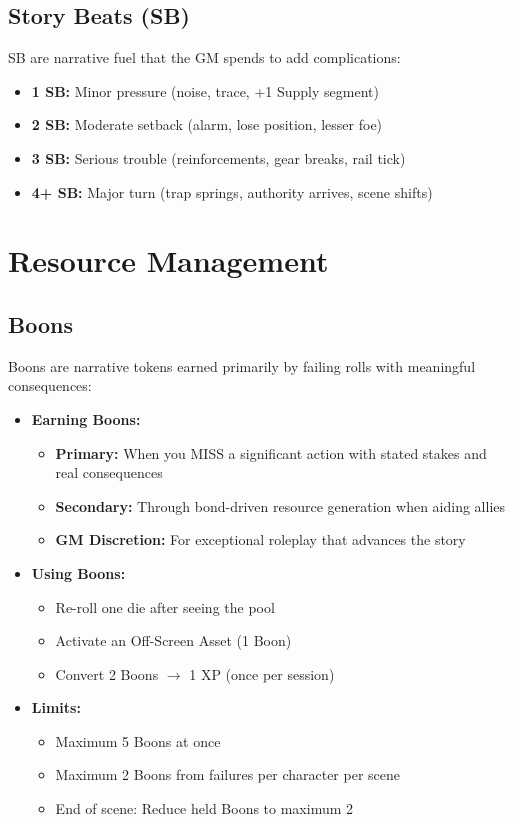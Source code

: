 \documentclass[11pt]{article}
\begin{document}
\subsection{Story Beats (SB)}

SB are narrative fuel that the GM spends to add complications:
\begin{itemize}
\item \textbf{1 SB:} Minor pressure (noise, trace, +1 Supply segment)
\item \textbf{2 SB:} Moderate setback (alarm, lose position, lesser foe)
\item \textbf{3 SB:} Serious trouble (reinforcements, gear breaks, rail tick)
\item \textbf{4+ SB:} Major turn (trap springs, authority arrives, scene shifts)
\end{itemize}

\section{Resource Management}

\subsection{Boons}

Boons are narrative tokens earned primarily by failing rolls with meaningful consequences:

\begin{itemize}
\item \textbf{Earning Boons:}
   \begin{itemize}
   \item \textbf{Primary:} When you MISS a significant action with stated stakes and real consequences
   \item \textbf{Secondary:} Through bond-driven resource generation when aiding allies
   \item \textbf{GM Discretion:} For exceptional roleplay that advances the story
   \end{itemize}
\item \textbf{Using Boons:}
   \begin{itemize}
   \item Re-roll one die after seeing the pool
   \item Activate an Off-Screen Asset (1 Boon)
   \item Convert 2 Boons $\rightarrow$ 1 XP (once per session)
   \end{itemize}
\item \textbf{Limits:}
   \begin{itemize}
   \item Maximum 5 Boons at once
   \item Maximum 2 Boons from failures per character per scene
   \item End of scene: Reduce held Boons to maximum 2
   \end{itemize}
\end{itemize}
\end{document}
